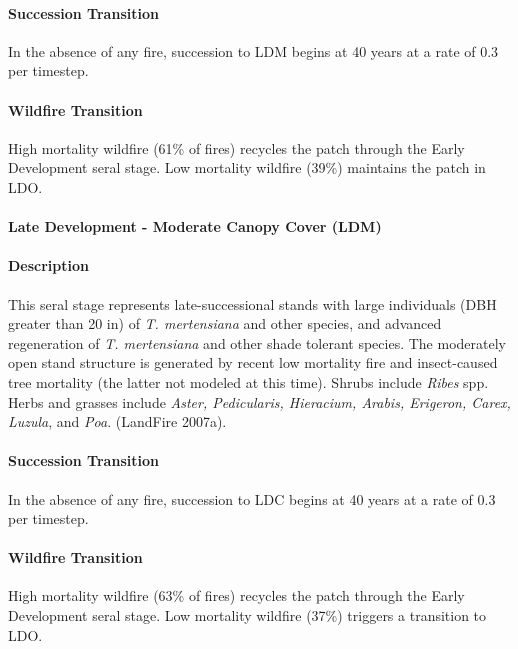 \paragraph{Succession Transition} In the absence of any fire, succession to LDM begins at 40 years at a rate of 0.3 per timestep.

\paragraph{Wildfire Transition} High mortality wildfire (61\% of fires) recycles the patch through the Early Development seral stage. Low mortality wildfire (39\%) maintains the patch in LDO.

\noindent\hrulefill

\paragraph{Late Development - Moderate Canopy Cover (LDM)}

\paragraph{Description} This seral stage represents late-successional stands with large individuals (DBH greater than 20 in) of \emph{T. mertensiana} and other species, and advanced regeneration of \emph{T. mertensiana} and other shade tolerant species. The moderately open stand structure is generated by recent low mortality fire and insect-caused tree mortality (the latter not modeled at this time). Shrubs include \emph{Ribes} spp. Herbs and grasses include \emph{Aster, Pedicularis, Hieracium, Arabis, Erigeron, Carex, Luzula}, and \emph{Poa}. (LandFire 2007a).

\paragraph{Succession Transition} In the absence of any fire, succession to LDC begins at 40 years at a rate of 0.3 per timestep.

\paragraph{Wildfire Transition} High mortality wildfire (63\% of fires) recycles the patch through the Early Development seral stage. Low mortality wildfire (37\%) triggers a transition to LDO. 

\noindent\hrulefill

